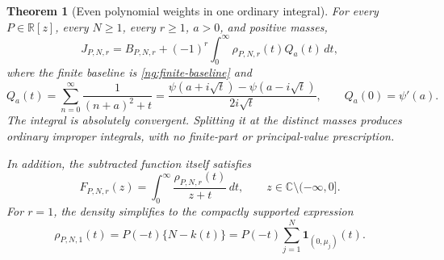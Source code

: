 \documentclass[11pt,letterpaper]{article}
\numberwithin{equation}{section}
\newtheorem{theorem}{Theorem}[section]
\theoremstyle{definition}
\theoremstyle{remark}
\begin{document}
\begin{theorem}[Even polynomial weights in one ordinary integral]
\label{ng:master}
For every $P\in\mathbb R[z]$, every $N\geq1$, every $r\geq1$,
$a>0$, and positive masses,
\begin{equation}
 \boxed{\displaystyle
 J_{P,N,r}=B_{P,N,r}
          +(-1)^r\int_0^{\infty}\rho_{P,N,r}(t)Q_a(t)\,dt,}
 \label{ng:master-formula}
\end{equation}
where the finite baseline is \eqref{ng:finite-baseline} and
\begin{equation}
 Q_a(t)=\sum_{n=0}^{\infty}\frac1{(n+a)^2+t}
       =\frac{\psi(a+i\sqrt t)-\psi(a-i\sqrt t)}{2i\sqrt t},
 \qquad Q_a(0)=\psi'(a).
 \label{ng:digamma-kernel}
\end{equation}
The integral is absolutely convergent.  Splitting it at the
distinct masses produces ordinary improper integrals, with no
finite-part or principal-value prescription.

In addition, the subtracted function itself satisfies
\begin{equation}
 F_{P,N,r}(z)=\int_0^{\infty}
                         \frac{\rho_{P,N,r}(t)}{z+t}\,dt,
 \qquad z\in\mathbb C\setminus(-\infty,0].
 \label{ng:stieltjes-representation}
\end{equation}
For $r=1$, the density simplifies to the compactly supported
expression
\begin{equation}
 \rho_{P,N,1}(t)=P(-t)\{N-k(t)\}
       =P(-t)\sum_{j=1}^{N}\boldsymbol1_{(0,\mu_j)}(t).
 \label{ng:first-density}
\end{equation}
\end{theorem}
\end{document}
